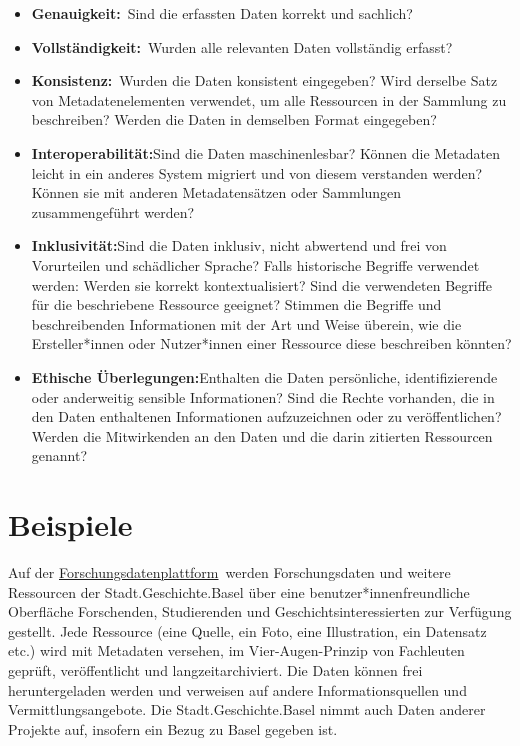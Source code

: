 \documentclass[
  nswissgerman,
  letterpaper,
  DIV=11,
  numbers=noendperiod]{scrartcl}
\providecommand{\tightlist}{%
  \setlength{\itemsep}{0pt}\setlength{\parskip}{0pt}}
\begin{document}
\begin{itemize}
\tightlist
\item
  \textbf{Genauigkeit:}~Sind die erfassten Daten korrekt und sachlich?
\item
  \textbf{Vollständigkeit:}~Wurden alle relevanten Daten vollständig
  erfasst?
\item
  \textbf{Konsistenz:}~Wurden die Daten konsistent eingegeben? Wird
  derselbe Satz von Metadatenelementen verwendet, um alle Ressourcen in
  der Sammlung zu beschreiben? Werden die Daten in demselben Format
  eingegeben?
\item
  \textbf{Interoperabilität:}Sind die Daten maschinenlesbar? Können die
  Metadaten leicht in ein anderes System migriert und von diesem
  verstanden werden? Können sie mit anderen Metadatensätzen oder
  Sammlungen zusammengeführt werden?
\item
  \textbf{Inklusivität:}Sind die Daten inklusiv, nicht abwertend und
  frei von Vorurteilen und schädlicher Sprache? Falls historische
  Begriffe verwendet werden: Werden sie korrekt kontextualisiert? Sind
  die verwendeten Begriffe für die beschriebene Ressource geeignet?
  Stimmen die Begriffe und beschreibenden Informationen mit der Art und
  Weise überein, wie die Ersteller*innen oder Nutzer*innen einer
  Ressource diese beschreiben könnten?
\item
  \textbf{Ethische Überlegungen:}Enthalten die Daten persönliche,
  identifizierende oder anderweitig sensible Informationen? Sind die
  Rechte vorhanden, die in den Daten enthaltenen Informationen
  aufzuzeichnen oder zu veröffentlichen? Werden die Mitwirkenden an den
  Daten und die darin zitierten Ressourcen genannt?
\end{itemize}

\section{Beispiele}\label{beispiele}

Auf der
\href{https://forschung.stadtgeschichtebasel.ch/}{Forschungsdatenplattform}~werden
Forschungsdaten und weitere Ressourcen der Stadt.Geschichte.Basel über
eine benutzer*innenfreundliche Oberfläche Forschenden, Studierenden und
Geschichtsinteressierten zur Verfügung gestellt. Jede Ressource (eine
Quelle, ein Foto, eine Illustration, ein Datensatz etc.) wird mit
Metadaten versehen, im Vier-Augen-Prinzip von Fachleuten geprüft,
veröffentlicht und langzeitarchiviert. Die Daten können frei
heruntergeladen werden und verweisen auf andere Informationsquellen und
Vermittlungsangebote. Die Stadt.Geschichte.Basel nimmt auch Daten
anderer Projekte auf, insofern ein Bezug zu Basel gegeben ist.
\end{document}
